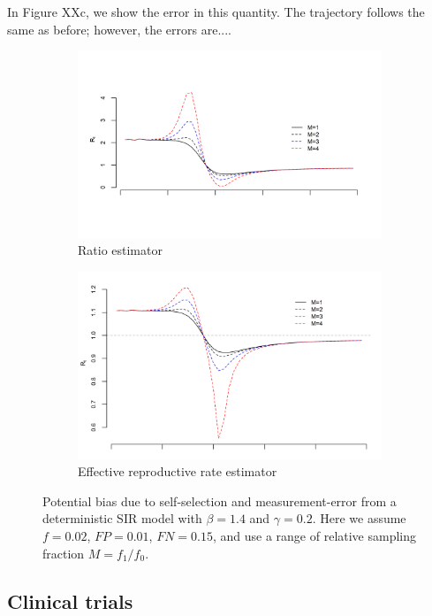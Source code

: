 \documentclass[aoas]{amsart}
\begin{document}
In Figure XXc, we show the error in this quantity.  The trajectory follows the same as before; however, the errors are....


\begin{figure}
\centering
\begin{subfigure}{.5\textwidth}
  \centering
  \includegraphics[width=.9\linewidth]{../methods/figs/sir_ratio.png}
  \caption{Ratio estimator}
  \label{fig:sub1}
\end{subfigure}%
\begin{subfigure}{.5\textwidth}
  \centering
  \includegraphics[width=.9\linewidth]{../methods/figs/sir_rt.png}
  \caption{Effective reproductive rate estimator}
  \label{fig:sub2}
\end{subfigure}
\caption{Potential bias due to self-selection and measurement-error from a deterministic SIR model with $\beta = 1.4$ and $\gamma = 0.2$.  Here we assume $f = 0.02$, $FP = 0.01$, $FN = 0.15$, and use a range of relative sampling fraction $M = f_1/f_0$.}
\label{fig:test}
\end{figure}

\subsection{Clinical trials}
\end{document}
